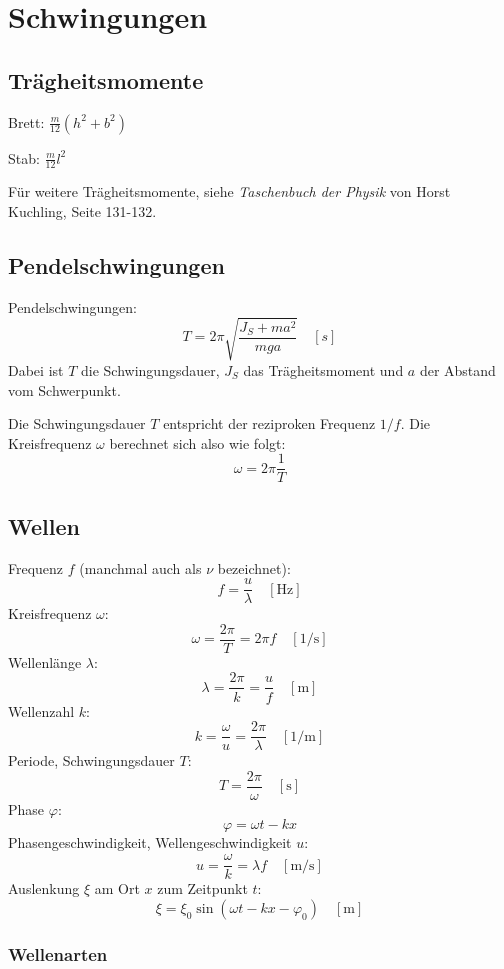 \section{Schwingungen}

\subsection{Trägheitsmomente}

Brett: $\displaystyle\frac{m}{12} \left(h^2 + b^2\right)$

Stab: $\displaystyle\frac{m}{12} l^2$

Für weitere Trägheitsmomente, siehe \textit{Taschenbuch der Physik} von Horst
Kuchling, Seite 131-132.

\subsection{Pendelschwingungen}

Pendelschwingungen:
\[
	T = 2 \pi \sqrt{\frac{J_S + ma^2}{mga}}	
	\quad \left[ s \right]
\]
Dabei ist $T$ die Schwingungsdauer, $J_S$ das Trägheitsmoment und $a$ der
Abstand vom Schwerpunkt.

Die Schwingungsdauer $T$ entspricht der reziproken Frequenz $1/f$. Die
Kreisfrequenz $\omega$ berechnet sich also wie folgt:
\[
	\omega = 2\pi\frac{1}{T}
\]

\subsection{Wellen}



Frequenz $f$ (manchmal auch als $\nu$ bezeichnet):
\[
	f = \frac{u}{\lambda}
	\quad \left[ \textrm{Hz} \right]
\]
Kreisfrequenz $\omega$:
\[
	\omega = \frac{2 \pi}{T} = 2 \pi f
	\quad \left[ 1/\textrm{s} \right]
\]
Wellenlänge $\lambda$:
\[
	\lambda = \frac{2 \pi}{k} = \frac{u}{f}
	\quad \left[ \textrm{m} \right]
\]
Wellenzahl $k$:
\[
	k = \frac{\omega}{u} = \frac{2 \pi}{\lambda}
	\quad \left[ 1/\textrm{m} \right]
\]
Periode, Schwingungsdauer $T$:
\[
	T = \frac{2 \pi}{\omega}
	\quad \left[ \textrm{s} \right]
\]
Phase $\varphi$:
\[
	\varphi = \omega t - k x
\]
Phasengeschwindigkeit, Wellengeschwindigkeit $u$:
\[
	u = \frac{\omega}{k} = \lambda f
	\quad \left[ \textrm{m} / \textrm{s} \right]
\]
Auslenkung $\xi$ am Ort $x$ zum Zeitpunkt $t$:
\[
	\xi = \xi_0 \sin (\omega t - k x - \varphi_0)
	\quad \left[ \textrm{m} \right]
\]

\subsubsection{Wellenarten}

